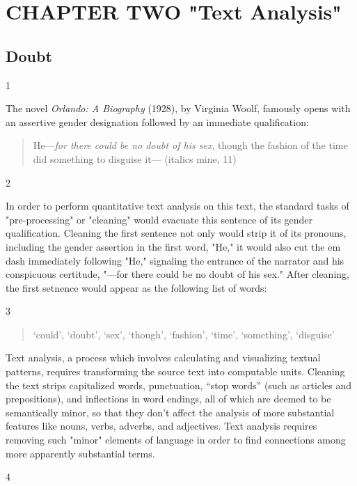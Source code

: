 \documentclass[11pt]{article}
\author{fcalado}
\date{\today}
\title{}
\begin{document}
\tableofcontents

\section{CHAPTER TWO "Text Analysis"}
\label{sec:org9921c5f}

\subsection{Doubt}
\label{sec:orgb75dff6}
1

The novel \emph{Orlando: A Biography} (1928), by Virginia Woolf, famously
opens with an assertive gender designation followed by an immediate
qualification:

\begin{quote}
He---\emph{for there could be no doubt of his sex}, though the fashion of
the time did something to disguise it--- (italics mine, 11)
\end{quote}

2

In order to perform quantitative text analysis on this text, the
standard tasks of "pre-processing" or "cleaning" would evacuate this
sentence of its gender qualification. Cleaning the first sentence not
only would strip it of its pronouns, including the gender assertion in
the first word, "He," it would also cut the em dash immediately
following "He," signaling the entrance of the narrator and his
conspicuous certitude, "---for there could be no doubt of his sex."
After cleaning, the first setnence would appear as the following list
of words:

3

\begin{quote}
‘could’, ‘doubt’, ‘sex’, ‘though’, ‘fashion’, ‘time’, ‘something’,
‘disguise’
\end{quote}

Text analysis, a process which involves calculating and visualizing
textual patterns, requires transforming the source text into
computable units. Cleaning the text strips capitalized words,
punctuation, “stop words” (such as articles and prepositions), and
inflections in word endings, all of which are deemed to be
semantically minor, so that they don't affect the analysis of more
substantial features like nouns, verbs, adverbs, and adjectives. Text
analysis requires removing such "minor" elements of language in order
to find connections among more apparently substantial terms.

4
\end{document}

